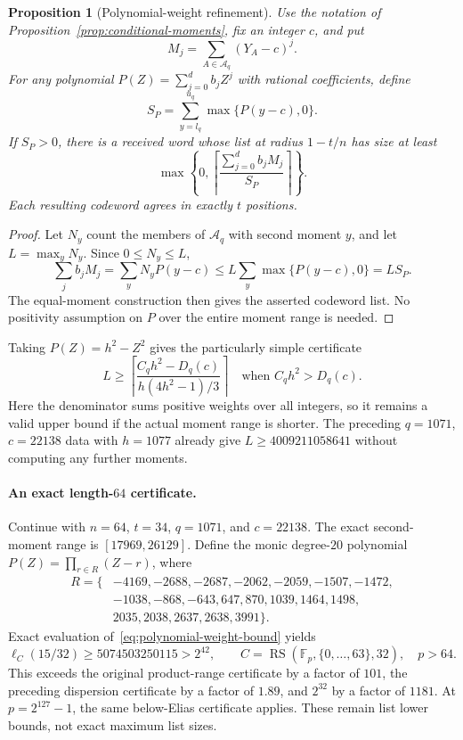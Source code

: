 \documentclass[11pt,letterpaper]{article}
\newtheorem{proposition}[theorem]{Proposition}
\theoremstyle{definition}
\theoremstyle{remark}
\newcommand{\F}{\mathbb F}
\newcommand{\RS}{\operatorname{RS}}
\begin{document}
\begin{proposition}[Polynomial-weight refinement]
\label{prop:polynomial-moment-weights}
Use the notation of Proposition~\ref{prop:conditional-moments}, fix an
integer $c$, and put
\[
 M_j=\sum_{A\in\mathcal A_q}(Y_A-c)^j.
\]
For any polynomial $P(Z)=\sum_{j=0}^d b_jZ^j$ with rational
coefficients, define
\[
 S_P=\sum_{y=l_q}^{u_q}\max\{P(y-c),0\}.
\]
If $S_P>0$, there is a received word whose list at radius $1-t/n$
has size at least
\begin{equation}\label{eq:polynomial-weight-bound}
 \max\left\{0,\left\lceil
 \frac{\sum_{j=0}^d b_jM_j}{S_P}\right\rceil\right\}.
\end{equation}
Each resulting codeword agrees in exactly $t$ positions.
\end{proposition}
\begin{proof}
Let $N_y$ count the members of $\mathcal A_q$ with second moment $y$,
and let $L=\max_yN_y$. Since $0\le N_y\le L$,
\[
 \sum_j b_jM_j=\sum_y N_yP(y-c)
 \le L\sum_y\max\{P(y-c),0\}=LS_P.
\]
The equal-moment construction then gives the asserted codeword list.
No positivity assumption on $P$ over the entire moment range is needed.
\end{proof}

Taking $P(Z)=h^2-Z^2$ gives the particularly simple certificate
\[
 L\ge\left\lceil
 \frac{C_qh^2-D_q(c)}{h(4h^2-1)/3}\right\rceil
 \quad\text{when }C_qh^2>D_q(c).
\]
Here the denominator sums positive weights over all integers, so it
remains a valid upper bound if the actual moment range is shorter.
The preceding $q=1071$, $c=22138$ data with $h=1077$ already give
$L\ge4009211058641$ without computing any further moments.

\paragraph{An exact length-$64$ certificate.}
Continue with $n=64$, $t=34$, $q=1071$, and $c=22138$.
The exact second-moment range is $[17969,26129]$. Define the monic
degree-$20$ polynomial $P(Z)=\prod_{r\in R}(Z-r)$, where
\[
\begin{split}
R=\{&-4169,-2688,-2687,-2062,-2059,-1507,-1472,\\
    &-1038,-868,-643,647,870,1039,1464,1498,\\
    &2035,2038,2637,2638,3991\}.
\end{split}
\]
Exact evaluation of~\eqref{eq:polynomial-weight-bound} yields
\begin{equation}\label{eq:weighted-n64}
 \ell_C(15/32)\ge5074503250115>2^{42},\qquad
 C=\RS(\F_p,\{0,\ldots,63\},32),\quad p>64.
\end{equation}
This exceeds the original product-range certificate by a factor of
$101$, the preceding dispersion certificate by a factor of $1.89$,
and $2^{32}$ by a factor of $1181$. At $p=2^{127}-1$, the same
below-Elias certificate applies. These remain list lower bounds,
not exact maximum list sizes.
\end{document}
